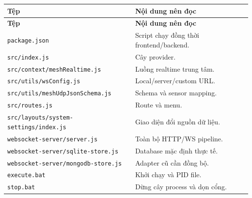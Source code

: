 \documentclass[a4paper]{article}
\newcommand{\pathcode}[1]{\nolinkurl{#1}}
\begin{document}
\begin{longtable}{p{6.3cm}p{7.7cm}}
\toprule
\textbf{Tệp} & \textbf{Nội dung nên đọc}\\
\midrule\endfirsthead
\toprule
\textbf{Tệp} & \textbf{Nội dung nên đọc}\\
\midrule\endhead
\pathcode{package.json} & Script chạy đồng thời frontend/backend.\\
\pathcode{src/index.js} & Cây provider.\\
\pathcode{src/context/meshRealtime.js} & Luồng realtime trung tâm.\\
\pathcode{src/utils/wsConfig.js} & Local/server/custom URL.\\
\pathcode{src/utils/meshUdpJsonSchema.js} & Schema và sensor mapping.\\
\pathcode{src/routes.js} & Route và menu.\\
\pathcode{src/layouts/system-settings/index.js} & Giao diện đổi nguồn dữ liệu.\\
\pathcode{websocket-server/server.js} & Toàn bộ HTTP/WS pipeline.\\
\pathcode{websocket-server/sqlite-store.js} & Database mặc định thực tế.\\
\pathcode{websocket-server/mongodb-store.js} & Adapter cũ cần đồng bộ.\\
\pathcode{execute.bat} & Khởi chạy và PID file.\\
\pathcode{stop.bat} & Dừng cây process và dọn cổng.\\
\bottomrule
\end{longtable}
\end{document}
